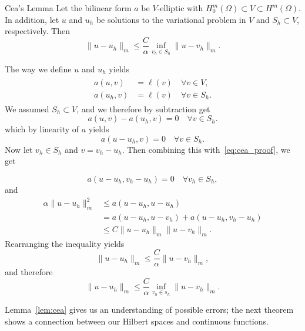 \begin{lem}{Cea's Lemma\label{lem:cea}}
    Let the bilinear form $a$ be $V$-elliptic with $H_0^m(\Omega)\subset V \subset H^m(\Omega)$. In addition, let $u$ and $u_h$ be solutions to the variational problem in $V$ and $S_h\subset V$, respectively. Then
    \begin{equation}
        \label{eq:cea}
        \|u-u_h\|_m\leq \frac{C}{\alpha}\inf_{v_h\in S_h} \|u-v_h\|_m.
    \end{equation}
    
\end{lem}
\begin{bev}
    The way we define $u$ and $u_h$ yields
    \begin{align}
    \begin{split}
        a(u,v)&= \ell(v) \quad \forall v\in V,\\
        a(u_h,v)&=\ell(v) \quad \forall v\in S_h.
    \end{split}
    \end{align}
    We assumed $S_h\subset V$, and we therefore by subtraction get
    \begin{equation}
        a(u,v)-a(u_h,v)=0 \quad \forall v\in S_h.
    \end{equation}
    which by linearity of $a$ yields
    \begin{equation}
        \label{eq:cea_proof}
        a(u-u_h,v)=0 \quad \forall v\in S_h.
    \end{equation}
    Now let $v_h\in S_h$ and $v=v_h-u_h$. Then combining this with~\eqref{eq:cea_proof}, we get  

    \begin{equation}
        a(u-u_h,v_h-u_h)=0 \quad \forall v_h\in S_h,
    \end{equation}
    and
    \begin{align*}
        \alpha\|u-u_h\|_m^2&\leq a(u-u_h,u-u_h)\\
        &=a(u-u_h,u-v_h)+a(u-u_h,v_h-u_h)\\ 
        &\leq C\|u-u_h\|_m\|u-v_h\|_m.
    \end{align*}
    Rearranging the inequality yields 
    \begin{equation}
        \|u-u_h\|_m\leq \frac{C}{\alpha} \|u-v_h\|_m,
    \end{equation} 
    and therefore
    \begin{equation}
        \|u-u_h\|_m\leq \frac{C}{\alpha}\inf_{v_h\in s_h} \|u-v_h\|_m.
    \end{equation}
\end{bev}
Lemma~\ref{lem:cea} gives us an understanding of possible errors; the next 
theorem shows a connection between our Hilbert spaces and continuous 
functions.